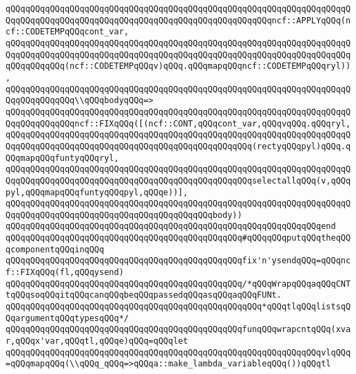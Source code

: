 \verb|qQQqqQQqqQQqqQQqqQQqqQQqqQQqqQQqqQQqqQQqqQQqqQQqqQQqqQQqqQQqqQQqqQQqqQQqqQQqqQQqqQQqqQQqqQQqqQQqqQQqqQQqqQQqqQQqqQQqqQQqqQQqncf::APPLYqQQq(ncf::CODETEMPqQQqcont_var,|\newline
\verb|qQQqqQQqqQQqqQQqqQQqqQQqqQQqqQQqqQQqqQQqqQQqqQQqqQQqqQQqqQQqqQQqqQQqqQQqqQQqqQQqqQQqqQQqqQQqqQQqqQQqqQQqqQQqqQQqqQQqqQQqqQQqqQQqqQQqqQQqqQQqqQQqqQQqqQQq(ncf::CODETEMPqQQqv)qQQq.qQQqmapqQQqncf::CODETEMPqQQqryl)),|\newline
\verb|qQQqqQQqqQQqqQQqqQQqqQQqqQQqqQQqqQQqqQQqqQQqqQQqqQQqqQQqqQQqqQQqqQQqqQQqqQQqqQQqqQQq\\qQQqbodyqQQq=>|\newline
\verb|qQQqqQQqqQQqqQQqqQQqqQQqqQQqqQQqqQQqqQQqqQQqqQQqqQQqqQQqqQQqqQQqqQQqqQQqqQQqqQQqqQQqncf::FIXqQQq([(ncf::CONT,qQQqcont_var,qQQqvqQQq.qQQqryl,|\newline
\verb|qQQqqQQqqQQqqQQqqQQqqQQqqQQqqQQqqQQqqQQqqQQqqQQqqQQqqQQqqQQqqQQqqQQqqQQqqQQqqQQqqQQqqQQqqQQqqQQqqQQqqQQqqQQqqQQqqQQqqQQq(rectyqQQqpyl)qQQq.qQQqmapqQQqfuntyqQQqryl,|\newline
\verb|qQQqqQQqqQQqqQQqqQQqqQQqqQQqqQQqqQQqqQQqqQQqqQQqqQQqqQQqqQQqqQQqqQQqqQQqqQQqqQQqqQQqqQQqqQQqqQQqqQQqqQQqqQQqqQQqqQQqqQQqselectallqQQq(v,qQQqpyl,qQQqmapqQQqfuntyqQQqpyl,qQQqe))],|\newline
\verb|qQQqqQQqqQQqqQQqqQQqqQQqqQQqqQQqqQQqqQQqqQQqqQQqqQQqqQQqqQQqqQQqqQQqqQQqqQQqqQQqqQQqqQQqqQQqqQQqqQQqqQQqqQQqqQQqbody))|\newline
\verb|qQQqqQQqqQQqqQQqqQQqqQQqqQQqqQQqqQQqqQQqqQQqqQQqqQQqqQQqqQQqqQQqend|\newline
\newline
\verb|qQQqqQQqqQQqqQQqqQQqqQQqqQQqqQQqqQQqqQQqqQQqqQQq#qQQqqQQqputqQQqtheqQQqcomponentqQQqinqQQq|\newline
\verb|qQQqqQQqqQQqqQQqqQQqqQQqqQQqqQQqqQQqqQQqqQQqqQQqfix'n'ysendqQQq=qQQqncf::FIXqQQq(fl,qQQqysend)|\newline
\newline
\verb|qQQqqQQqqQQqqQQqqQQqqQQqqQQqqQQqqQQqqQQqqQQqqQQq/*qQQqWrapqQQqaqQQqCNTtqQQqsoqQQqitqQQqcanqQQqbeqQQqpassedqQQqasqQQqaqQQqFUNt.|\newline
\verb|qQQqqQQqqQQqqQQqqQQqqQQqqQQqqQQqqQQqqQQqqQQqqQQqqQQq*qQQqtlqQQqlistsqQQqargumentqQQqtypesqQQq*/|\newline
\verb|qQQqqQQqqQQqqQQqqQQqqQQqqQQqqQQqqQQqqQQqqQQqqQQqfunqQQqwrapcntqQQq(xvar,qQQqx'var,qQQqtl,qQQqe)qQQq=qQQqlet|\newline
\verb|qQQqqQQqqQQqqQQqqQQqqQQqqQQqqQQqqQQqqQQqqQQqqQQqqQQqqQQqqQQqqQQqvlqQQq=qQQqmapqQQq(\\qQQq_qQQq=>qQQqa::make_lambda_variableqQQq())qQQqtl|\newline
